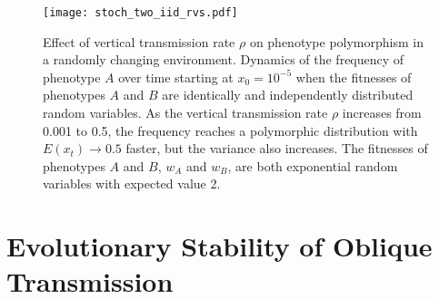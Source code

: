 \documentclass[9pt,twocolumn,twoside,lineno]{pnas-new}
\begin{document}
\begin{figure}[h]
\centering
\texttt{[image: stoch\_two\_iid\_rvs.pdf]}
\caption{Effect of vertical transmission rate $\rho$ on phenotype polymorphism in a randomly changing environment. Dynamics of the frequency of phenotype \(A\) over time starting at \(x_0=10^{-5}\) when the fitnesses of phenotypes \(A\) and \(B\) are identically and independently distributed random variables.
As the vertical transmission rate \(\rho\) increases from 0.001 to 0.5, the frequency reaches a polymorphic distribution with \(E(x_t)\to0.5\) faster,
but the variance also increases.
The fitnesses of phenotypes \(A\) and \(B\), \(w_A\) and \(w_B\), are both exponential random variables with expected value 2.}\label{fig:stoch_two_iid_rvs}
\end{figure}

\section{Evolutionary Stability of Oblique Transmission}
 
\end{document}
